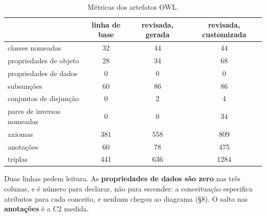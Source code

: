 \begin{table}[H]
\centering
\caption{Métricas dos artefatos OWL.}
\label{tab:2}
\scriptsize
\setlength{\tabcolsep}{3pt}
\begin{tabularx}{\linewidth}{>{\raggedright\arraybackslash\hsize=1.0000\hsize}Xccc}
\hline
 & \textbf{linha de base} & \textbf{revisada, gerada} & \textbf{revisada, customizada} \\
\hline
classes nomeadas & 32 & 44 & 44 \\
propriedades de objeto & 28 & 34 & 68 \\
propriedades de dados & 0 & 0 & 0 \\
subsunções & 60 & 86 & 86 \\
conjuntos de disjunção & 0 & 2 & 4 \\
pares de inversas nomeadas & 0 & 0 & 34 \\
axiomas & 381 & 558 & 809 \\
anotações & 60 & 78 & 475 \\
triplas & 441 & 636 & 1284 \\
\hline
\end{tabularx}
\end{table}

Duas linhas pedem leitura. As \textbf{propriedades de dados são zero} nas três colunas, e é número para declarar, não para esconder: a conceituação especifica atributos para cada conceito, e nenhum chegou ao diagrama (\S{}8). O salto nas \textbf{anotações} é a C2 medida.
